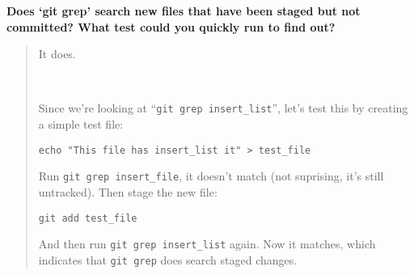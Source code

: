 \documentclass{article}
\begin{document}
\noindent
\textbf{Does `git grep' search new files that have been staged but not
committed? What test could you quickly run to find out?}
\begin{quote}
  \color{violet}
  It does.

  ~

  Since we're looking at ``\texttt{git~grep~insert\_list}'', let's test this
  by creating a simple test file:

  \texttt{echo "This file has insert\_list it" > test\_file}

  Run \texttt{git~grep~insert\_file}, it doesn't match (not suprising, it's
  still untracked). Then stage the new file:

  \texttt{git add test\_file}

  And then run \texttt{git~grep~insert\_list} again. Now it matches, which
  indicates that \texttt{git~grep} does search staged changes.
\end{quote}
\end{document}
